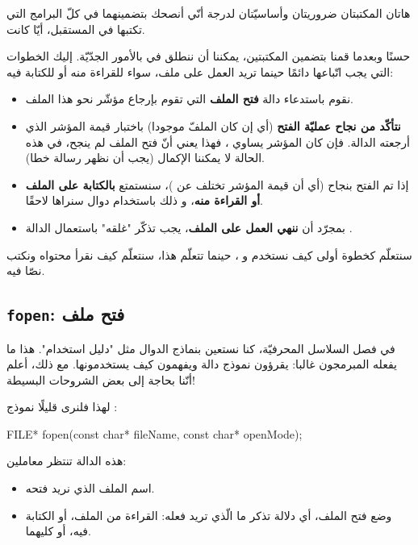 هاتان المكتبتان ضروريتان وأساسيّتان لدرجة أنّي أنصحك بتضمينهما في كلّ البرامج التي تكتبها في المستقبل، أيّا كانت.

حسنًا وبعدما قمنا بتضمين المكتبتين، يمكننا أن ننطلق في بالأمور الجدّيّة. إليك الخطوات التي يجب اتّباعها دائمًا حينما تريد العمل على ملف، سواء للقراءة منه أو للكتابة فيه:

\begin{itemize}
  \item نقوم باستدعاء دالة
\textbf{فتح الملف}
التي تقوم بإرجاع مؤشّر نحو هذا الملف.
  \item \textbf{نتأكّد من نجاح عمليّة الفتح}
(أي إن كان الملفّ موجودا) باختبار قيمة المؤشر الذي أرجعته الدالة. فإن كان المؤشر يساوي
،
فهذا يعني أنّ فتح الملف لم ينجح، في هذه الحالة لا يمكننا الإكمال (يجب أن نظهر رسالة خطا).
  \item إذا تم الفتح بنجاح (أي أن قيمة المؤشر تختلف عن
)،
سنستمتع
\textbf{بالكتابة على الملف أو القراءة منه}،
و ذلك باستخدام دوال سنراها لاحقًا.
  \item بمجرّد أن
\textbf{ننهي العمل على الملف}،
يجب تذكّر "غلقه" باستعمال الدالة
.
\end{itemize}

سنتعلّم كخطوة أولى كيف نستخدم
و
،
حينما تتعلّم هذا، سنتعلّم كيف نقرأ محتواه ونكتب نصّا فيه.

\subsection{\texttt{fopen}: فتح ملف}

في فصل السلاسل المحرفيّة، كنا نستعين بنماذج الدوال مثل "دليل استخدام". هذا ما يفعله المبرمجون غالبا: يقرؤون نموذج دالة ويفهمون كيف يستخدمونها. مع ذلك، أعلم أنّنا بحاجة إلى بعض الشروحات البسيطة!

لهذا فلنرى قليلًا نموذج
:

\begin{Csource}
FILE* fopen(const char* fileName, const char* openMode);
\end{Csource}

هذه الدالة تنتظر معاملين:

\begin{itemize}
  \item اسم الملف الذي نريد فتحه.
  \item وضع فتح الملف، أي دلالة تذكر ما الّذي تريد فعله: القراءة من الملف، أو الكتابة فيه، أو كليهما.
\end{itemize}

